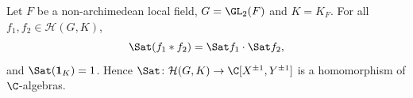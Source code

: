 Let $F$ be a non-archimedean local field, $G=\GL_2(F)$ and $K=K_F$. For all $f_1,f_2\in\mathcal H(G,K)$,
\[
  \Sat(f_1*f_2)=\Sat f_1\cdot\Sat f_2,
\]
and $\Sat(\mathbf 1_K)=1$. Hence $\Sat\colon\mathcal H(G,K)\to\C[X^{\pm1},Y^{\pm1}]$ is a homomorphism of
$\C$-algebras.
